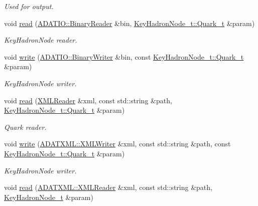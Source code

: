 \begin{DoxyCompactItemize}
\begin{DoxyCompactList}\small\item\em Used for output. \end{DoxyCompactList}\item 
void \mbox{\hyperlink{namespaceHadron_a60758467521910899dec197e7fbc0ab4}{read}} (\mbox{\hyperlink{classADATIO_1_1BinaryReader}{A\+D\+A\+T\+I\+O\+::\+Binary\+Reader}} \&bin, \mbox{\hyperlink{structHadron_1_1KeyHadronNode__t_1_1Quark__t}{Key\+Hadron\+Node\+\_\+t\+::\+Quark\+\_\+t}} \&param)
\begin{DoxyCompactList}\small\item\em Key\+Hadron\+Node reader. \end{DoxyCompactList}\item 
void \mbox{\hyperlink{namespaceHadron_ae47780c59de1d15679cc11611947b313}{write}} (\mbox{\hyperlink{classADATIO_1_1BinaryWriter}{A\+D\+A\+T\+I\+O\+::\+Binary\+Writer}} \&bin, const \mbox{\hyperlink{structHadron_1_1KeyHadronNode__t_1_1Quark__t}{Key\+Hadron\+Node\+\_\+t\+::\+Quark\+\_\+t}} \&param)
\begin{DoxyCompactList}\small\item\em Key\+Hadron\+Node writer. \end{DoxyCompactList}\item 
void \mbox{\hyperlink{namespaceHadron_a6eef93fdb3fe356c6326b6e8e0757ccb}{read}} (\mbox{\hyperlink{classADATXML_1_1XMLReader}{X\+M\+L\+Reader}} \&xml, const std\+::string \&path, \mbox{\hyperlink{structHadron_1_1KeyHadronNode__t_1_1Quark__t}{Key\+Hadron\+Node\+\_\+t\+::\+Quark\+\_\+t}} \&param)
\begin{DoxyCompactList}\small\item\em Quark reader. \end{DoxyCompactList}\item 
void \mbox{\hyperlink{namespaceHadron_aa7f9575393c93afa7db5f164da5c31eb}{write}} (\mbox{\hyperlink{classADATXML_1_1XMLWriter}{A\+D\+A\+T\+X\+M\+L\+::\+X\+M\+L\+Writer}} \&xml, const std\+::string \&path, const \mbox{\hyperlink{structHadron_1_1KeyHadronNode__t_1_1Quark__t}{Key\+Hadron\+Node\+\_\+t\+::\+Quark\+\_\+t}} \&param)
\begin{DoxyCompactList}\small\item\em Key\+Hadron\+Node writer. \end{DoxyCompactList}\item 
void \mbox{\hyperlink{namespaceHadron_acbb0293cc9773c6009050757b471c4d8}{read}} (\mbox{\hyperlink{classADATXML_1_1XMLReader}{A\+D\+A\+T\+X\+M\+L\+::\+X\+M\+L\+Reader}} \&xml, const std\+::string \&path, \mbox{\hyperlink{structHadron_1_1KeyHadronNode__t}{Key\+Hadron\+Node\+\_\+t}} \&param)

\end{DoxyCompactItemize}
